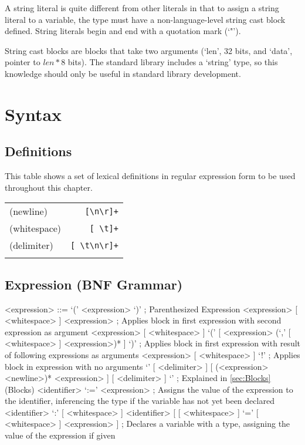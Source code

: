 \documentclass[letterpaper,titlepage]{scrreprt}
\begin{document}
A string literal is quite different from other literals in that to assign a string literal to a variable, the type must have a non-language-level string cast block defined. String literals begin and end with a quotation mark (`"').

String cast blocks are blocks that take two arguments (`len', 32 bits, and `data', pointer to $len * 8$ bits). The standard library includes a `string' type, so this knowledge should only be useful in standard library development.

\chapter{Syntax}
\label{ch:Syntax}

\section{Definitions}
\label{sec:Definitions}

This table shows a set of lexical definitions in regular expression form to be used throughout this chapter.

\begin{tabular}{l r}

(newline) & \lstinline|[\n\r]+| \\
\label{def:newline}
(whitespace) & \lstinline|[ \t]+| \\
\label{def:whitespace}
(delimiter) & \lstinline|[ \t\n\r]+| \\
\label{def:delimiter}

\end{tabular}

\section{Expression (BNF Grammar)}
\label{sec:Expression}

\begin{grammar}

<expression> ::= `(' <expression> `)' ; Parenthesized Expression
\alt <expression> [ <whitespace> ] <expression> ; Applies block in first expression with second expression as argument
\alt <expression> [ <whitespace> ] `(' [ <expression> (`,' [ <whitespace> ] <expression>)* ] `)' ; Applies block in first expression with result of following expressions as arguments
\alt <expression> [ <whitespace> ] `!' ; Applies block in expression with no arguments
\alt `{' [ <delimiter> ] [ (<expression> <newline>)* <expression> ] [ <delimiter> ] `}' ; Explained in \hyperref[sec:Blocks]{\ref{sec:Blocks}} (Blocks)
\alt <identifier> `:=' <expression> ; Assigns the value of the expression to the identifier, inferencing the type if the variable has not yet been declared
\alt <identifier> `:' [ <whitespace> ] <identifier> [ [ <whitespace> ] `=' [ <whitespace> ] <expression> ] ; Declares a variable with a type, assigning the value of the expression if given

\end{grammar}
\end{document}
